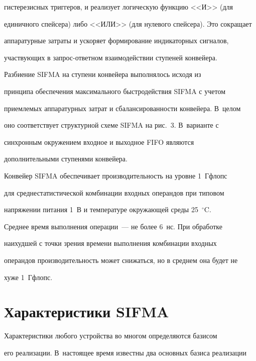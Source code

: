 гистерезисных триггеров, и реализует логическую функцию <<И>> (для

единичного спейсера) либо <<ИЛИ>> (для нулевого спейсера). Это сокращает

аппаратурные затраты и ускоряет формирование индикаторных сигналов,

участвующих в за\-прос-от\-вет\-ном взаимодействии ступеней конвейера.



      Разбиение SIFMA на ступени конвейера выполнялось исходя из

принципа обеспечения максимального быстродействия SIFMA с учетом

приемлемых аппаратурных затрат и сбалансированности конвейера. В~целом

оно соответствует структурной схеме SIFMA на рис.~3. В~варианте с

синхронным окружением входное и выходное FIFO являются

дополнительными ступенями конвейера.



      Конвейер SIFMA обеспечивает производительность на уровне 1~Гфлопс

для среднестатистической комбинации входных операндов при типовом

напряжении питания 1~В и температуре окружающей среды 25~$^\circ$C.

Среднее время выполнения операции~--- не более 6~нс. При обработке

наихудшей с точки зрения времени выполнения комбинации входных

операндов производительность может снижаться, но в среднем она будет не

хуже 1~Гфлопс.



\vspace*{-4pt}



\section{Характеристики SIFMA}



\vspace*{-2pt}



      Характеристики любого устройства во многом определяются базисом

его реализации. В~настоящее время известны два основных базиса реализации

